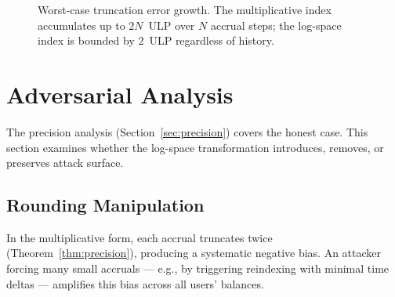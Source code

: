 \documentclass[10pt,a4paper,twocolumn]{article}
\theoremstyle{definition}
\theoremstyle{plain}
\theoremstyle{remark}
\begin{document}
\begin{figure}[htbp]
\centering
{}
\caption{Worst-case truncation error growth. The multiplicative index accumulates up to $2N$~ULP over $N$ accrual steps; the log-space index is bounded by $2$~ULP regardless of history.}
\label{fig:precision}
\end{figure}

\section{Adversarial Analysis}
\label{sec:adversarial}

The precision analysis (Section~\ref{sec:precision}) covers the honest case. This section examines whether the log-space transformation introduces, removes, or preserves attack surface.

\subsection{Rounding Manipulation}
\label{subsec:rounding-attack}

In the multiplicative form, each accrual truncates twice (Theorem~\ref{thm:precision}), producing a systematic negative bias. An attacker forcing many small accruals --- e.g., by triggering reindexing with minimal time deltas --- amplifies this bias across all users' balances.
\end{document}
